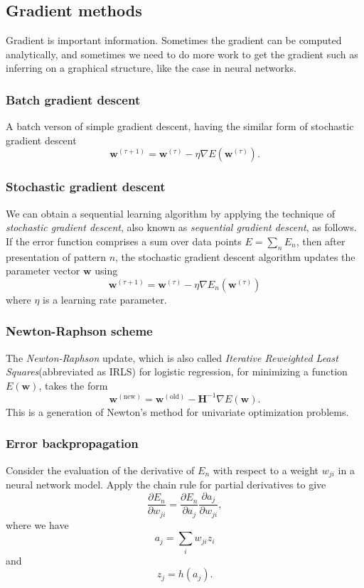 \documentclass[a4paper]{report}
\renewcommand{\bf}{\mathbf}
\newcommand{\imp}[1]{{\color{blue}\textit{#1}}}
\begin{document}
\subsection{Gradient methods}
Gradient is important information. Sometimes the gradient can be computed analytically, and sometimes we need to do more work to get the gradient such as inferring on a graphical structure, like the case in neural networks.
\subsubsection{Batch gradient descent}
A batch verson of simple gradient descent, having the similar form of stochastic gradient descent
\begin{equation}
	\bf{w}^{(\tau + 1)} = \bf{w}^{(\tau)} - \eta \nabla E(\bf{w}^{(\tau)}).
\end{equation}
\subsubsection{Stochastic gradient descent}
We can obtain a sequential learning algorithm by applying the technique of \imp{stochastic gradient descent}, also known as \imp{sequential gradient descent}, as follows. If the error function comprises a sum over data points $E=\sum_n E_n$, then after presentation of pattern $n$, the stochastic gradient descent algorithm updates the parameter vector $\bf{w}$ using
\begin{equation}
	\bf{w}^{(\tau + 1)} = \bf{w}^{(\tau)} - \eta \nabla E_n(\bf{w}^{(\tau)})
\end{equation}
where $\eta$ is a learning rate parameter.
\subsubsection{Newton-Raphson scheme}
The \imp{Newton-Raphson} update, which is also called \imp{Iterative Reweighted Least Squares}(abbreviated as IRLS) for logistic regression, for minimizing a function $E(\bf{w})$, takes the form
\begin{equation}
	\bf{w}^{(\text{new})} = \bf{w}^{(\text{old})} - \bf{H}^{-1} \nabla E(\bf{w}).
\end{equation}
This is a generation of Newton's method for univariate optimization problems.
\subsubsection{Error backpropagation}
Consider the evaluation of the derivative of $E_n$ with respect to a weight $w_{ji}$ in a neural network model. Apply the chain rule for partial derivatives to give
\begin{equation}
	\frac{\partial E_n}{\partial w_{ji}} = \frac{\partial E_n}{\partial a_j}\frac{\partial a_j}{\partial w_{ji}},
\end{equation}
where we have
\begin{equation}
	a_j = \sum_i w_{ji}z_i\label{prop1}
\end{equation}
and
\begin{equation}
	z_j = h(a_j).\label{prop2}
\end{equation}
\end{document}
